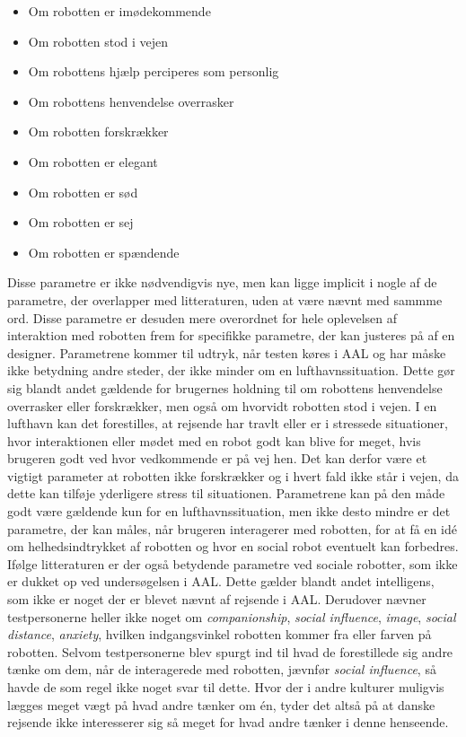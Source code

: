 \begin{multicols}{2}
	\begin{itemize}
		\item Om robotten er imødekommende
		\item Om robotten stod i vejen
		\item Om robottens hjælp perciperes som personlig
		\item Om robottens henvendelse overrasker
		\item Om robotten forskrækker
		\item Om robotten er elegant
		\item Om robotten er sød
		\item Om robotten er sej
		\item Om robotten er spændende
	\end{itemize}
\end{multicols}
\noindent
%
Disse parametre er ikke nødvendigvis nye, men kan ligge implicit i nogle af de parametre, der overlapper med litteraturen, uden at være nævnt med sammme ord. Disse parametre er desuden mere overordnet for hele oplevelsen af interaktion med robotten frem for specifikke parametre, der kan justeres på af en designer. Parametrene kommer til udtryk, når testen køres i AAL og har måske ikke betydning andre steder, der ikke minder om en lufthavnssituation. Dette gør sig blandt andet gældende for brugernes holdning til om robottens henvendelse overrasker eller forskrækker, men også om hvorvidt robotten stod i vejen. I en lufthavn kan det forestilles, at rejsende har travlt eller er i stressede situationer, hvor interaktionen eller mødet med en robot godt kan blive for meget, hvis brugeren godt ved hvor vedkommende er på vej hen. Det kan derfor være et vigtigt parameter at robotten ikke forskrækker og i hvert fald ikke står i vejen, da dette kan tilføje yderligere stress til situationen. Parametrene kan på den måde godt være gældende kun for en lufthavnssituation, men ikke desto mindre er det parametre, der kan måles, når brugeren interagerer med robotten, for at få en idé om helhedsindtrykket af robotten og hvor en social robot eventuelt kan forbedres. \blankline
%
Ifølge litteraturen er der også betydende parametre ved sociale robotter, som ikke er dukket op ved undersøgelsen i AAL. Dette gælder blandt andet intelligens, som ikke er noget der er blevet nævnt af rejsende i AAL. Derudover nævner testpersonerne heller ikke noget om \textit{companionship}, \textit{social influence}, \textit{image}, \textit{social distance}, \textit{anxiety}, hvilken indgangsvinkel robotten kommer fra eller farven på robotten. Selvom testpersonerne blev spurgt ind til hvad de forestillede sig andre tænke om dem, når de interagerede med robotten, jævnfør \textit{social influence}, så havde de som regel ikke noget svar til dette. Hvor der i andre kulturer muligvis lægges meget vægt på hvad andre tænker om én, tyder det altså på at danske rejsende ikke interesserer sig så meget for hvad andre tænker i denne henseende. 

